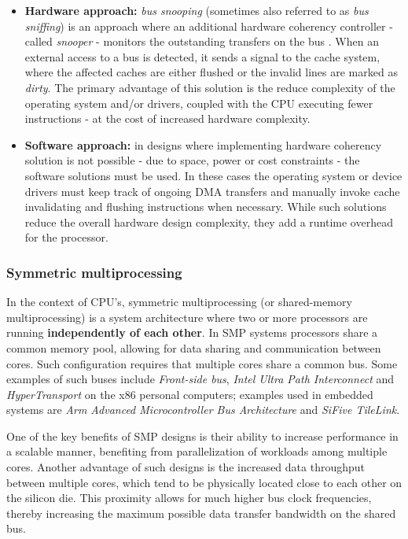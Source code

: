 \begin{itemize}
	\item \textbf{Hardware approach:} \textit{bus snooping} (sometimes also referred to as \textit{bus sniffing}) is an
		approach where an additional hardware coherency controller - called \textit{snooper} - monitors the outstanding
		transfers on the bus \cite{snoopy}. When an external access to a bus is detected, it sends a signal to the cache system, where the
		affected caches are either flushed or the invalid lines are marked as \textit{dirty}. The primary advantage of this solution is the reduce
		complexity of the operating system and/or drivers, coupled with the CPU executing fewer instructions - at the cost of increased hardware complexity.
	\item \textbf{Software approach:} in designs where implementing hardware coherency solution is not possible - due to space, power or cost constraints -
		the software solutions must be used. In these cases the operating system or device drivers must keep track of ongoing DMA transfers and manually
		invoke cache invalidating and flushing instructions when necessary. While such solutions reduce the overall hardware design complexity, they add a
		runtime overhead for the processor.
\end{itemize}


\subsubsection{Symmetric multiprocessing}

In the context of CPU's, symmetric multiprocessing (or shared-memory multiprocessing) is a system architecture where two or more processors
are running \textbf{independently of each other}. In SMP systems processors share a common memory pool, allowing for data sharing and communication
between cores. Such configuration requires that multiple cores share a common bus. Some examples of such buses include \textit{Front-side bus}, \textit{Intel Ultra Path Interconnect}
and \textit{HyperTransport} on the x86 personal computers; examples used in embedded systems are \textit{Arm Advanced Microcontroller Bus Architecture} and \textit{SiFive TileLink}.

One of the key benefits of SMP designs is their ability to increase performance in a scalable manner, benefiting from parallelization of workloads among multiple cores.
Another advantage of such designs is the increased data throughput between multiple cores, which tend to be physically located close to each other on the silicon die.
This proximity allows for much higher bus clock frequencies, thereby increasing the maximum possible data transfer bandwidth on the shared bus.


